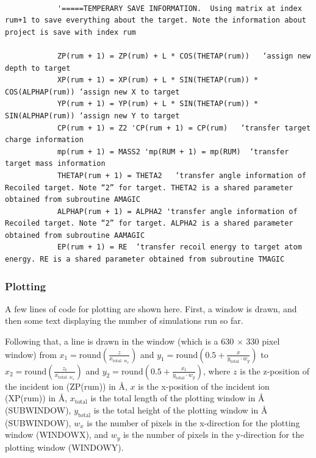 \documentclass[10pt, reqno]{exam}
\begin{document}
\begin{verbatim}   
            
            '=====TEMPERARY SAVE INFORMATION.  Using matrix at index rum+1 to save everything about the target. Note the information about project is save with index rum
    
            ZP(rum + 1) = ZP(rum) + L * COS(THETAP(rum))   ‘assign new depth to target
            XP(rum + 1) = XP(rum) + L * SIN(THETAP(rum)) * COS(ALPHAP(rum)) ‘assign new X to target 
            YP(rum + 1) = YP(rum) + L * SIN(THETAP(rum)) * SIN(ALPHAP(rum)) ‘assign new Y to target
            CP(rum + 1) = Z2 'CP(rum + 1) = CP(rum)   ‘transfer target charge information
            mp(rum + 1) = MASS2 'mp(RUM + 1) = mp(RUM)  ‘transfer target mass information
            THETAP(rum + 1) = THETA2   ‘transfer angle information of Recoiled target. Note “2” for target. THETA2 is a shared parameter obtained from subroutine AMAGIC 
            ALPHAP(rum + 1) = ALPHA2 'transfer angle information of  Recoiled target. Note “2” for target. ALPHA2 is a shared parameter obtained from subroutine AAMAGIC
            EP(rum + 1) = RE  ‘transfer recoil energy to target atom energy. RE is a shared parameter obtained from subroutine TMAGIC
\end{verbatim}

\subsubsection{Plotting}
\label{sec:ion plotting}

A few lines of code for plotting are shown here. First, a window is drawn, and then some text displaying the number of simulations run so far. \par

Following that, a line is drawn in the window (which is a 630 $\times$ 330 pixel window) from $x_1 = \text{round}\left(\frac{z}{x_{\text{total}\cdot w_x}}\right)$ and $y_1 = \text{round}\left(0.5 + \frac{x}{y_{\text{total}}\cdot w_y}\right)$ to $x_2 = \text{round}\left(\frac{z_t}{x_{\text{total}\cdot w_x}}\right)$ and $y_2 = \text{round}\left(0.5 + \frac{x_t}{y_{\text{total}}\cdot w_y}\right)$, where $z$ is the z-position of the incident ion (ZP(rum)) in \si{\angstrom}, $x$ is the x-position of the incident ion (XP(rum)) in \si{\angstrom}, $x_{\text{total}}$ is the total length of the plotting window in \si{\angstrom} (SUBWINDOW), $y_{\text{total}}$ is the total height of the plotting window in \si{\angstrom} (SUBWINDOW), $w_x$ is the number of pixels in the x-direction for the plotting window (WINDOWX), and $w_y$ is the number of pixels in the y-direction for the plotting window (WINDOWY). \par
\end{document}

